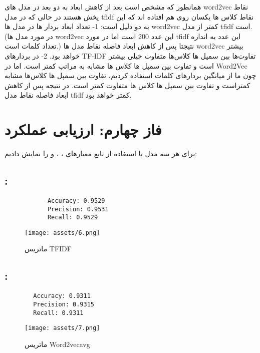 \documentclass[a4paper,12pt]{article}
\begin{document}
همانطور که مشخص است بعد از کاهش ابعاد به دو بعد در مدل های  word2vec نقاط پخش هستند  در حالی که در مدل tfidf نقاط کلاس ها یکسان روی هم افتاده اند که این به دو دلیل است:
1- تعداد ابعاد بردار ها در مدل ها word2vec کمتر از مدل tfidf است.(در مورد مدل ها word2vec این عدد 200 است اما در مورد tfidf این عدد به اندازه تعداد کلمات است.) نتیجتا پس از کاهش ابعاد فاصله نقاط مدل ها word2vec بیشتر خواهد بود.
2- در بردارهای TF-IDF تفاوت‌ها بین سمپل ها  کلاس‌ها متفاوت خیلی بیشتر است و تفاوت بین سمپل ها کلاس ها مشابه به مراتب کمتر است. اما در Word2Vec چون ما از میانگین بردارهای کلمات استفاده کردیم، تفاوت‌ بین سمپل ها کلاس‌ها مشابه کمتراست و تفاوت بین سمپل ها کلاس ها متفاوت کمتر است. در نتیجه پس از کاهش ابعاد فاصله نقاط مدل tfidf کمتر خواهد بود.
	
	
	\section{فاز چهارم: ارزیابی عملکرد}
	
	
	برای هر سه مدل با استفاده از تابع  معیارهای ، 
	،  و  را نمایش دادیم:
	
	\subsection*{:}
	
	\begin{latin}
		\begin{verbatim}
			Accuracy: 0.9529
			Precision: 0.9531
			Recall: 0.9529
		\end{verbatim}
	\end{latin}
	
	\begin{figure}[H]
		\centering
		\texttt{[image: assets/6.png]}
		\caption{\textcolor{CustomAccent}{ماتریس TFIDF}}
	\end{figure}
	
	
\subsection*{:}
	
\begin{latin}
	\begin{verbatim}
		Accuracy: 0.9311
		Precision: 0.9315
		Recall: 0.9311
	\end{verbatim}
\end{latin}

		
\begin{figure}[H]
	\centering
	\texttt{[image: assets/7.png]}
	\caption{\textcolor{CustomAccent}{ماتریس Word2vecavg}}
\end{figure}
	
\end{document}
